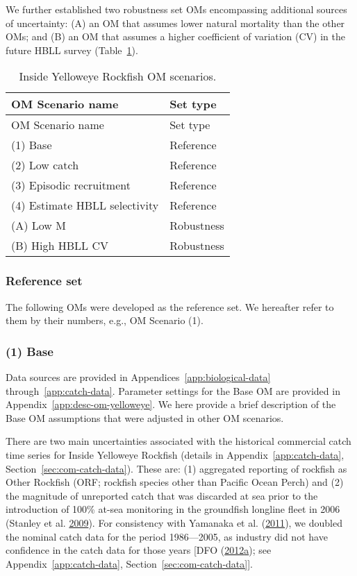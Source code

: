 \documentclass[11pt]{book}
\begin{document}
We further established two robustness set OMs encompassing additional sources of uncertainty: (A) an OM that assumes lower natural mortality than the other OMs; and (B) an OM that assumes a higher coefficient of variation (CV) in the future HBLL survey (Table~\ref{tab:ye-scen}).
\begin{longtable}[]{@{}ll@{}}
\caption{\label{tab:ye-scen}Inside Yelloweye Rockfish OM scenarios.}\tabularnewline
\toprule
OM Scenario name & Set type\tabularnewline
\midrule
\endfirsthead
\toprule
OM Scenario name & Set type\tabularnewline
\midrule
\endhead
(1) Base & Reference\tabularnewline
(2) Low catch & Reference\tabularnewline
(3) Episodic recruitment & Reference\tabularnewline
(4) Estimate HBLL selectivity & Reference\tabularnewline
(A) Low M & Robustness\tabularnewline
(B) High HBLL CV & Robustness\tabularnewline
\bottomrule
\end{longtable}
\hypertarget{sec:approach3-reference}{%
\subsubsection{Reference set}\label{sec:approach3-reference}}

The following OMs were developed as the reference set. We hereafter refer to them by their numbers, e.g., OM Scenario (1).

\hypertarget{sec:approach3-reference1}{%
\subsubsection{(1) Base}\label{sec:approach3-reference1}}

Data sources are provided in Appendices~\ref{app:biological-data} through~\ref{app:catch-data}. Parameter settings for the Base OM are provided in Appendix~\ref{app:desc-om-yelloweye}. We here provide a brief description of the Base OM assumptions that were adjusted in other OM scenarios.

There are two main uncertainties associated with the historical commercial catch time series for Inside Yelloweye Rockfish (details in Appendix~\ref{app:catch-data}, Section~\ref{sec:com-catch-data}). These are: (1) aggregated reporting of rockfish as Other Rockfish (ORF; rockfish species other than Pacific Ocean Perch) and (2) the magnitude of unreported catch that was discarded at sea prior to the introduction of 100\% at-sea monitoring in the groundfish longline fleet in 2006 (Stanley et al. \protect\hyperlink{ref-stanley2009}{2009}). For consistency with Yamanaka et al. (\protect\hyperlink{ref-yamanaka2011}{2011}), we doubled the nominal catch data for the period 1986---2005, as industry did not have confidence in the catch data for those years {[}DFO (\protect\hyperlink{ref-dfo2012}{2012}\protect\hyperlink{ref-dfo2012}{a}); see Appendix~\ref{app:catch-data}, Section~\ref{sec:com-catch-data}{]}.
\end{document}

